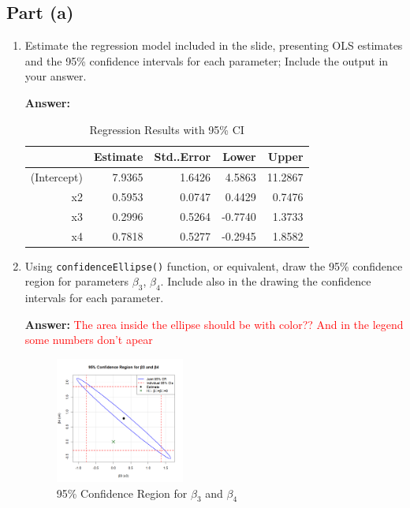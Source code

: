\documentclass[12pt,a4paper]{article}
\begin{document}
\subsection*{Part (a)}
\begin{enumerate}[label=(\roman*)]
  \item Estimate the regression model included in the slide, presenting OLS estimates and the 95\% confidence intervals for each parameter; Include the output in your answer.
  
  \textbf{Answer:} 
 
\begin{table}[ht]
    \centering
    \caption{Regression Results with 95\% CI} 
    \label{tab:regression}
  \begin{tabular}{rrrrr}
    \hline
    & Estimate & Std..Error & Lower & Upper \\ 
    \hline
    (Intercept) & 7.9365 & 1.6426 & 4.5863 & 11.2867 \\ 
    x2 & 0.5953 & 0.0747 & 0.4429 & 0.7476 \\ 
    x3 & 0.2996 & 0.5264 & -0.7740 & 1.3733 \\ 
    x4 & 0.7818 & 0.5277 & -0.2945 & 1.8582 \\ 
    \hline
  \end{tabular}
\end{table}

  
  \item Using \texttt{confidenceEllipse()} function, or equivalent, draw the 95\% confidence region for parameters $\beta_3$, $\beta_4$. Include also in the drawing the confidence intervals for each parameter.
  
  \textbf{Answer:} \textcolor{red}{The area inside the ellipse should be with color?? And in the legend some numbers don't apear}


    \begin{figure}[H]  %
      \centering
      \includegraphics[width=0.4\textwidth]{Files/q1ii_plot.png}
      \caption{95\% Confidence Region for $\beta_3$ and $\beta_4$}
      \label{fig:ellipse}
    \end{figure}


\end{enumerate}
\end{document}
